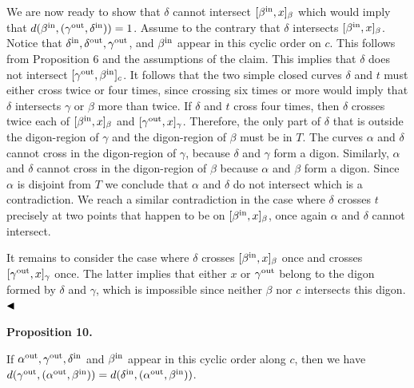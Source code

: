 \documentclass[10pt,a4paper]{amsart}
\begin{document}
\par
\par
We are now ready to show that $\delta$ cannot intersect $[\beta^{\rm in},x]_{\beta}$ which would imply that $d(\beta^{\rm in},(\gamma^{\rm out},\delta^{\rm in}))=1$. Assume to the contrary that $\delta$ intersects $[\beta^{\rm in},x]_{\beta}$. Notice that $\delta^{\rm in},\delta^{\rm out},\gamma^{\rm out}$, and $\beta^{\rm in}$ appear in this cyclic order on $c$. This follows from Proposition 6 and the assumptions of the claim. This implies that $\delta$ does not intersect $[\gamma^{\rm out},\beta^{\rm in}]_{c}$. It follows that the two simple closed curves $\delta$ and $t$ must either cross twice or four times, since crossing six times or more would imply that $\delta$ intersects $\gamma$ or $\beta$ more than twice. If $\delta$ and $t$ cross four times, then $\delta$ crosses twice each of $[\beta^{\rm in},x]_{\beta}$ and $[\gamma^{\rm out},x]_{\gamma}$. Therefore, the only part of $\delta$ that is outside the digon-region of $\gamma$ and the digon-region of $\beta$ must be in $T$. The curves $\alpha$ and $\delta$ cannot cross in the digon-region of $\gamma$, because $\delta$ and $\gamma$ form a digon. Similarly, $\alpha$ and $\delta$ cannot cross in the digon-region of $\beta$ because $\alpha$ and $\beta$ form a digon. Since $\alpha$ is disjoint from $T$ we conclude that $\alpha$ and $\delta$ do not intersect which is a contradiction. We reach a similar contradiction in the case where $\delta$ crosses $t$ precisely at two points that happen to be on $[\beta^{\rm in},x]_{\beta}$, once again $\alpha$ and $\delta$ cannot intersect.
\par
\par
It remains to consider the case where $\delta$ crosses $[\beta^{\rm in},x]_{\beta}$ once and crosses $[\gamma^{\rm out},x]_{\gamma}$ once. The latter implies that either $x$ or $\gamma^{\rm out}$ belong to the digon formed by $\delta$ and $\gamma$, which is impossible since neither $\beta$ nor $c$ intersects this digon. $\hfill\blacktriangleleft$
\par
\par
\par\medskip\noindent\textbf{Proposition 10.}\par
If $\alpha^{\rm out},\gamma^{\rm out},\delta^{\rm in}$ and $\beta^{\rm in}$ appear in this cyclic order along $c$, then we have $d(\gamma^{\rm out},(\alpha^{\rm out},\beta^{\rm in}))=d(\delta^{\rm in},(%
\alpha^{\rm out},\beta^{\rm in}))$.
\par
\par
\end{document}
